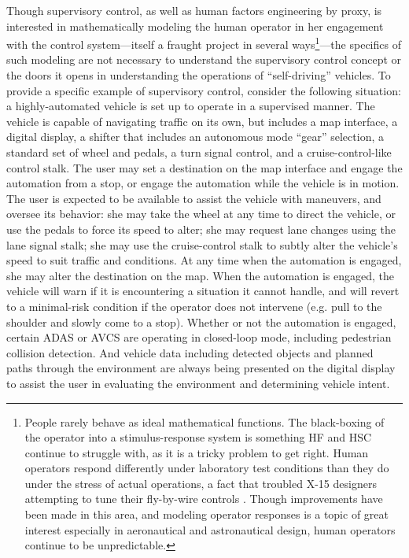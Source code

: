 Though supervisory control, as well as human factors engineering by proxy, is
interested in mathematically modeling the human operator in her
engagement with the control system---itself a fraught project in
several ways\footnote{People rarely behave as ideal mathematical
  functions. The black-boxing of the operator into a stimulus-response
system is something HF and HSC continue to struggle with, as it is a
tricky problem to get right. Human operators respond differently under
laboratory test conditions than they do under the stress of actual
operations, a fact that troubled X-15 designers attempting to tune
their fly-by-wire controls \cite[p. 54]{DM}. Though
improvements have been made in this area, and modeling operator
responses is a topic of great interest especially in aeronautical and
astronautical design, human operators continue to be
unpredictable.}---the specifics of such modeling are not necessary to
understand the supervisory control concept or the doors it opens in
understanding the operations of ``self-driving'' vehicles. To provide
a specific example of supervisory control, consider the following
situation: a highly-automated vehicle is set up to operate in a
supervised manner. The vehicle is capable of navigating traffic on its
own, but includes a map interface, a digital display, a shifter that includes an
autonomous mode ``gear'' selection, a standard set of wheel and
pedals, a turn signal control,
and a cruise-control-like control stalk. The user may set a
destination on the map interface and engage the automation from a stop, or engage
the automation while the vehicle is in motion. The user is expected to
be available to assist the vehicle with maneuvers, and oversee its
behavior:  she may take the wheel at any time to direct the vehicle,
or use the pedals to force its speed to alter; she may request lane
changes using the lane signal stalk; she may use the cruise-control
stalk to subtly alter the vehicle's speed to suit traffic and
conditions. At any time when the automation is engaged, she may alter
the destination on the map. When the automation is engaged, the
vehicle will warn if it is encountering a situation it cannot handle,
and will revert to a minimal-risk condition if the operator does not
intervene (e.g. pull to the shoulder and slowly come to a stop).
Whether or not the automation is engaged,
certain ADAS or AVCS are operating in closed-loop mode, including
pedestrian collision detection. And vehicle data including detected
objects and planned paths through the environment are always being
presented on the digital display to assist the user in evaluating the
environment and determining vehicle intent.

